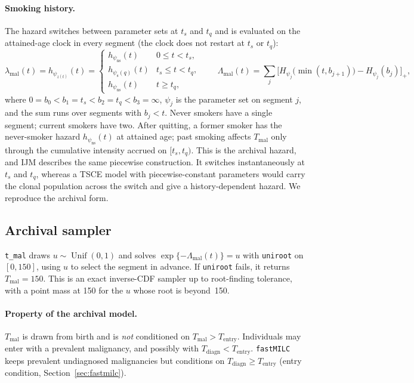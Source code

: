 \documentclass[11pt]{article}
\newcommand{\code}[1]{\texttt{#1}}
\newcommand{\Unif}{\operatorname{Unif}}
\newcommand{\Tentry}{T_{\mathrm{entry}}}
\newcommand{\Tmal}{T_{\mathrm{mal}}}
\newcommand{\Tdiagn}{T_{\mathrm{diagn}}}
\newcommand{\ns}{\mathrm{ns}}
\newcommand{\sm}{\mathrm{s}}
\begin{document}
\paragraph{Smoking history.} The hazard switches between parameter sets at
$t_s$ and $t_q$ and is evaluated on the attained-age clock in every segment
(the clock does not restart at $t_s$ or $t_q$):
\begin{equation}\label{eq:lambdaM}
\lambda_{\mathrm{mal}}(t) = h_{\psi_{z(t)}}(t) =
\begin{cases}
h_{\psi_\ns}(t) & 0 \le t < t_s,\\
h_{\psi_\sm(q)}(t) & t_s \le t < t_q,\\
h_{\psi_\ns}(t) & t \ge t_q,
\end{cases}
\qquad
\Lambda_{\mathrm{mal}}(t) = \sum_{j} \Big[H_{\psi_j}\big(\min(t,b_{j+1})\big) - H_{\psi_j}(b_j)\Big]_{+},
\end{equation}
where $0=b_0<b_1=t_s<b_2=t_q<b_3=\infty$, $\psi_j$ is the parameter set on
segment $j$, and the sum runs over segments with $b_j<t$. Never smokers have a
single segment; current smokers have two. After quitting, a former smoker has
the never-smoker hazard $h_{\psi_\ns}(t)$ at attained age; past smoking affects
$\Tmal$ only through the cumulative intensity accrued on $[t_s,t_q)$. This is
the archival hazard, and IJM describes the same piecewise construction. It
switches instantaneously at $t_s$ and $t_q$, whereas a TSCE model with
piecewise-constant parameters would carry the clonal population across the
switch and give a history-dependent hazard. We reproduce the archival form.

\subsection{Archival sampler}
\code{t\_mal} draws $u\sim\Unif(0,1)$ and solves
$\exp\{-\Lambda_{\mathrm{mal}}(t)\}=u$ with \code{uniroot} on $[0,150]$, using $u$
to select the segment in advance. If \code{uniroot} fails, it returns
$\Tmal=150$. This is an exact inverse-CDF sampler up to root-finding tolerance,
with a point mass at 150 for the $u$ whose root is beyond~150.

\paragraph{Property of the archival model.} $\Tmal$ is drawn from birth and is
\emph{not} conditioned on $\Tmal > \Tentry$. Individuals may enter with a
prevalent malignancy, and possibly with $\Tdiagn<\Tentry$. \code{fastMILC}
keeps prevalent undiagnosed malignancies but conditions on $\Tdiagn\ge\Tentry$
(entry condition, Section~\ref{sec:fastmilc}).
\end{document}
